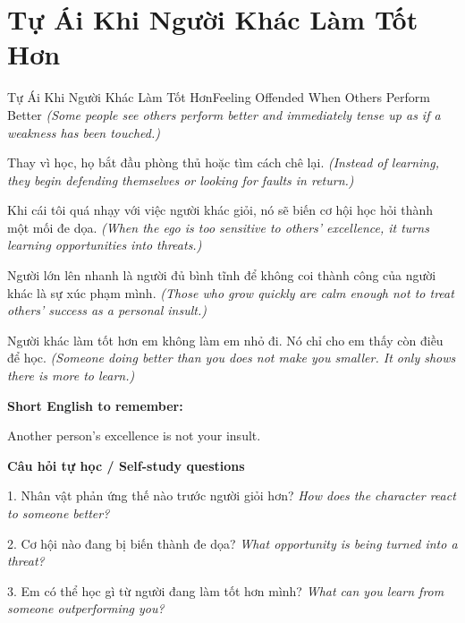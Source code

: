 \section{Tự Ái Khi Người Khác Làm Tốt Hơn}
\begin{truyen}{Tự Ái Khi Người Khác Làm Tốt Hơn}{Feeling Offended When Others Perform Better}
\textit{(Some people see others perform better and immediately tense up as if a weakness has been touched.)}

Thay vì học, họ bắt đầu phòng thủ hoặc tìm cách chê lại.
\textit{(Instead of learning, they begin defending themselves or looking for faults in return.)}

Khi cái tôi quá nhạy với việc người khác giỏi, nó sẽ biến cơ hội học hỏi thành một mối đe dọa.
\textit{(When the ego is too sensitive to others' excellence, it turns learning opportunities into threats.)}

Người lớn lên nhanh là người đủ bình tĩnh để không coi thành công của người khác là sự xúc phạm mình.
\textit{(Those who grow quickly are calm enough not to treat others' success as a personal insult.)}

\end{truyen}

\begin{baihoc}
Người khác làm tốt hơn em không làm em nhỏ đi. Nó chỉ cho em thấy còn điều để học.
\textit{(Someone doing better than you does not make you smaller. It only shows there is more to learn.)}
\end{baihoc}

\begin{ghinhoanh}
\textbf{Short English to remember:}

Another person's excellence is not your insult.

\end{ghinhoanh}

\begin{tuhocnhanh}
\textbf{Câu hỏi tự học / Self-study questions}

1. Nhân vật phản ứng thế nào trước người giỏi hơn? \textit{How does the character react to someone better?}

2. Cơ hội nào đang bị biến thành đe dọa? \textit{What opportunity is being turned into a threat?}

3. Em có thể học gì từ người đang làm tốt hơn mình? \textit{What can you learn from someone outperforming you?}
\end{tuhocnhanh}
\ngancach

